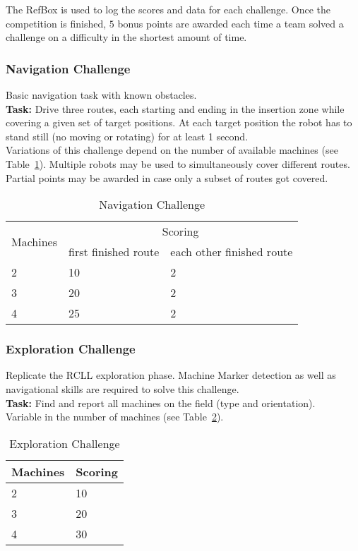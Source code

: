 \documentclass[12pt,twoside]{article}
\newcommand{\reftab}[1]{Table~\ref{#1}}
\begin{document}
The RefBox is used to log the scores and data for each challenge.
Once the competition is finished, $5$ bonus points are awarded each time a
team solved a challenge on a difficulty in the shortest amount of time.

\subsubsection{Navigation Challenge}\label{sec:challenge-navigation}
Basic navigation task with known obstacles.\\
\textbf{Task:} Drive three routes, each starting and ending in the insertion
zone while covering a given set of target positions. At each target position
the robot has to stand still (no moving or rotating) for at least 1 second. \\
Variations of this challenge depend
on the number of
available machines (see \reftab{tab:challenge-navigation}).
Multiple robots may be used to simultaneously cover different routes.
Partial points may be awarded in case only a subset of routes got covered.


\begin{table}[!htb]
    \centering
        \begin{tabular}{l|l|l}
					\multirow{2}{*}{Machines}
					& \multicolumn{2}{c}{Scoring} \\\cline{2-3}
					& first finished route & each other finished route \\\hline\hline
					2 & 10 & 2 \\
					3 & 20 & 2 \\
					4 & 25 & 2 \\
        \end{tabular}
    \caption{Navigation Challenge}
    \label{tab:challenge-navigation}
\end{table}

\subsubsection{Exploration Challenge}\label{sec:challenge-exploration}
Replicate the RCLL exploration phase.
Machine Marker detection as well as navigational skills are required to solve
this challenge.\\
\textbf{Task:} Find and report all machines on the field (type and orientation).
\\
Variable in the number of machines
(see \reftab{tab:challenge-exploration}).
\begin{table}[!htb]
 \centering
  \begin{tabular}{l|l}
					Machines & Scoring \\\hline
					2   & 10 \\
					3   & 20  \\
					4   & 30  \\
        \end{tabular}
    \caption{Exploration Challenge}
    \label{tab:challenge-exploration}
\end{table}
\end{document}
